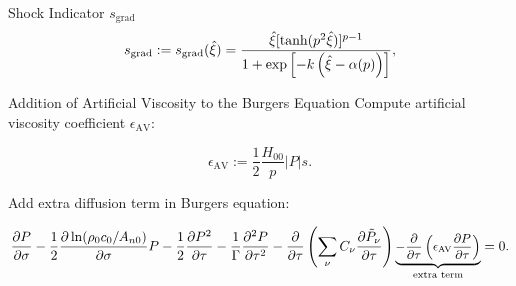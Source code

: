 \documentclass{beamer}
\newcounter{sectionframecount}
\begin{document}
\begin{frame}[t]{Shock Indicator $s_{\text{grad}}$}
  \vspace{-10pt}
  \begin{equation}
    \small
    s_\text{grad} := s_\text{grad}(\hat{\xi}) = \dfrac{\hat{\xi} [\tanh(p^2\hat{\xi})]^{p-1}}{1+\exp\left[-k \left(\hat{\xi} - \alpha(p)\right)\right]},
    \label{e:s_grad}
  \end{equation}

  \end{frame}


\begin{frame}[t]{Addition of Artificial Viscosity to the Burgers Equation}
Compute artificial viscosity coefficient $\epsilon_{\text{AV}}$:

\begin{equation}
  \epsilon_{\text{AV}} := \dfrac{1}{2}\dfrac{H_{00}}{p}|P|s.
\end{equation}

Add extra diffusion term in Burgers equation:

\begin{equation}
  \small
  \dfrac{\partial P}{\partial \sigma}
  -\dfrac{1}{2}\dfrac{\partial \ln(\rho_0c_0/A_{n0})}{\partial \sigma}P
  -\dfrac{1}{2}\dfrac{\partial P^2}{\partial \tau}
  -\dfrac{1}{\Gamma}\dfrac{\partial ^2 P}{\partial \tau^2}
  -\dfrac{\partial }{\partial \tau}\left(\sum_{\nu} C_\nu \dfrac{\partial\tilde{P}_\nu}{\partial \tau}\right)
  \underbrace{- \dfrac{\partial}{\partial \tau} \left(\epsilon_{\text{AV}}\dfrac{\partial P}{\partial \tau}\right)}_{\text{extra term}}
  =0.
\end{equation}

\end{frame}
\end{document}
